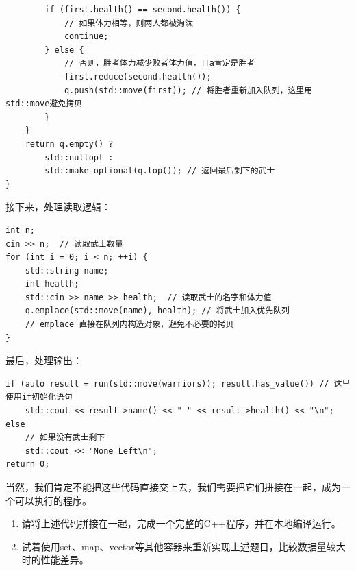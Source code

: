 \begin{answer}
\begin{verbatim}
        if (first.health() == second.health()) {
            // 如果体力相等，则两人都被淘汰
            continue;
        } else {
            // 否则，胜者体力减少败者体力值，且a肯定是胜者
            first.reduce(second.health());
            q.push(std::move(first)); // 将胜者重新加入队列，这里用std::move避免拷贝
        }
    }
    return q.empty() ? 
        std::nullopt : 
        std::make_optional(q.top()); // 返回最后剩下的武士
}
\end{verbatim}


  接下来，处理读取逻辑：
\begin{verbatim}
int n;
cin >> n;  // 读取武士数量
for (int i = 0; i < n; ++i) {
    std::string name;
    int health;
    std::cin >> name >> health;  // 读取武士的名字和体力值
    q.emplace(std::move(name), health); // 将武士加入优先队列
    // emplace 直接在队列内构造对象，避免不必要的拷贝
}
\end{verbatim}

  最后，处理输出：
\begin{verbatim}
if (auto result = run(std::move(warriors)); result.has_value()) // 这里使用if初始化语句
    std::cout << result->name() << " " << result->health() << "\n";
else 
    // 如果没有武士剩下
    std::cout << "None Left\n";
return 0;
\end{verbatim}

  当然，我们肯定不能把这些代码直接交上去，我们需要把它们拼接在一起，成为一个可以执行的程序。
\end{answer}

\begin{exercise}
  \begin{enumerate}
    \item 请将上述代码拼接在一起，完成一个完整的C++程序，并在本地编译运行。
    \item 试着使用set、map、vector等其他容器来重新实现上述题目，比较数据量较大时的性能差异。
  \end{enumerate}
\end{exercise}

